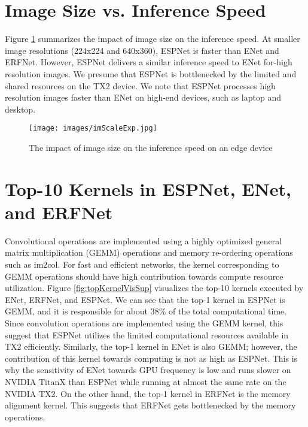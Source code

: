 \documentclass[runningheads]{llncs}
\begin{document}
\section{Image Size vs. Inference Speed}
\label{sec:impactSup}
Figure \ref{fig:impactImSpeedSup} summarizes the impact of image size on the inference speed. At smaller image resolutions (224x224 and 640x360), ESPNet is faster than ENet and ERFNet. However, ESPNet delivers a similar inference speed to ENet for-high resolution images. We presume that ESPNet is bottlenecked by the limited and shared resources on the TX2 device. We note that ESPNet processes high resolution images faster than ENet on high-end devices, such as laptop and desktop.

\begin{figure}[b!]
	\centering
	\texttt{[image: images/imScaleExp.jpg]}
	\caption{The impact of image size on the inference speed on an edge device}
	\label{fig:impactImSpeedSup}
\end{figure}

\section{Top-10 Kernels in ESPNet, ENet, and ERFNet}
\label{sec:topKernSUp}

Convolutional operations are implemented using a highly optimized general matrix multiplication (GEMM) operations and memory re-ordering operations such as im2col. For fast and efficient networks, the kernel corresponding to GEMM operations should have high contribution towards compute resource utilization. Figure \ref{fig:topKernelVisSup} visualizes the top-10 kernels executed by ENet, ERFNet, and ESPNet. We can see that the top-1 kernel in ESPNet is GEMM, and it is responsible for about 38\% of the total computational time. Since convolution operations are implemented using the GEMM kernel, this suggest that ESPNet utilizes the limited computational resources available in TX2 efficiently. Similarly, the top-1 kernel in ENet is also GEMM; however, the contribution of this kernel towards computing is not as high as ESPNet. This is why the sensitivity of ENet towards GPU frequency is low and runs  slower on NVIDIA TitanX than ESPNet while running at almost the same rate on the NVIDIA TX2. On the other hand, the top-1 kernel in ERFNet is the memory alignment kernel. This suggests that ERFNet gets bottlenecked by the memory operations.
\end{document}
